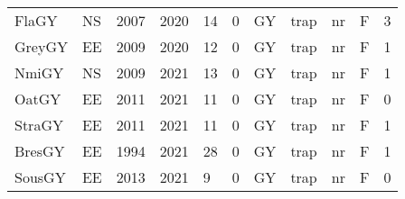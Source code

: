 \begin{table}[htbp]
\begin{tabular}{p{1cm}p{1cm}p{1cm}p{1cm}p{0.8cm}p{0.8cm}p{1cm}p{2cm}p{2cm}p{1cm}p{1cm}}
  FlaGY & NS & 2007 & 2020 & 14 & 0 & GY & trap & nr & F & 3 \\ 
  GreyGY & EE & 2009 & 2020 & 12 & 0 & GY & trap & nr & F & 1 \\ 
  NmiGY & NS & 2009 & 2021 & 13 & 0 & GY & trap & nr & F & 1 \\ 
  OatGY & EE & 2011 & 2021 & 11 & 0 & GY & trap & nr & F & 0 \\ 
  StraGY & EE & 2011 & 2021 & 11 & 0 & GY & trap & nr & F & 1 \\ 
  BresGY & EE & 1994 & 2021 & 28 & 0 & GY & trap & nr & F & 1 \\ 
  SousGY & EE & 2013 & 2021 & 9 & 0 & GY & trap & nr & F & 0 \\ 
   \hline
\end{tabular}
\end{table}
